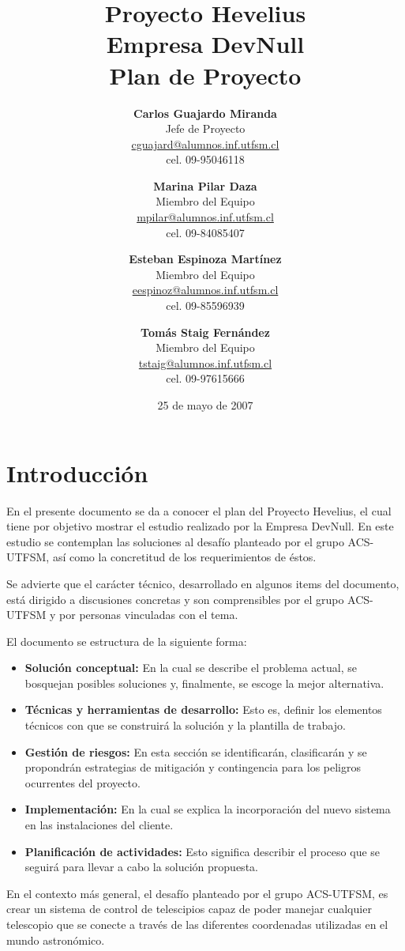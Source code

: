 \documentclass[letterpaper,spanish,10pt]{article}
\title{{\Huge \bf Proyecto Hevelius} \\ {\Large Empresa DevNull} \\ {\small Plan de Proyecto}}
\author{
{\bf Carlos Guajardo Miranda} \\ Jefe de Proyecto \\ \url{cguajard@alumnos.inf.utfsm.cl} \\ cel. 09-95046118 
\and
{\bf Marina Pilar Daza} \\ Miembro del Equipo \\ \url{mpilar@alumnos.inf.utfsm.cl} \\ cel. 09-84085407
\and
{\bf Esteban Espinoza Mart\'inez} \\ Miembro del Equipo \\ \url{eespinoz@alumnos.inf.utfsm.cl} \\ cel. 09-85596939
\and
{\bf Tom\'as Staig Fern\'andez} \\ Miembro del Equipo \\ \url{tstaig@alumnos.inf.utfsm.cl} \\ cel. 09-97615666
}
\date{25 de mayo de 2007}
\begin{document}
\maketitle
\newpage

\tableofcontents{}
\newpage




\section{Introducci\'on}
En el presente documento se da a conocer el plan del Proyecto Hevelius, el cual 
tiene por objetivo mostrar el estudio realizado por la Empresa DevNull. 
En este estudio se contemplan las soluciones al desaf\'io planteado por el grupo
ACS-UTFSM, as\'i como la concretitud de los requerimientos de \'estos.

Se advierte que el car\'acter t\'ecnico, desarrollado en algunos items del documento,
est\'a dirigido a discusiones concretas y son comprensibles por el grupo ACS-UTFSM 
y por personas vinculadas con el tema.

El documento se estructura de la siguiente forma:
\begin{itemize}
        \item \textbf{Soluci\'on conceptual:} En la cual se describe el problema 
actual, se bosquejan posibles soluciones y, finalmente, se escoge la mejor alternativa.
        \item \textbf{T\'ecnicas y herramientas de desarrollo:} Esto es, definir 
los elementos t\'ecnicos con que se construir\'a la soluci\'on y la plantilla de trabajo.
        \item \textbf{Gesti\'on de riesgos:} En esta secci\'on se identificar\'an, 
clasificar\'an y se propondr\'an estrategias de mitigaci\'on y contingencia para los 
peligros ocurrentes del proyecto.
        \item \textbf{Implementaci\'on:} En la cual se explica la incorporaci\'on del 
nuevo sistema en las instalaciones del cliente.
        \item \textbf{Planificaci\'on de actividades:} Esto significa describir el 
proceso que se seguir\'a para llevar a cabo la soluci\'on propuesta.
\end{itemize}

En el contexto m\'as general, el desaf\'io planteado por el grupo ACS-UTFSM, es 
crear un sistema de control de telescipios capaz de poder manejar cualquier telescopio 
que se conecte a trav\'es de las diferentes coordenadas utilizadas en el mundo 
astron\'omico.\\
\end{document}
